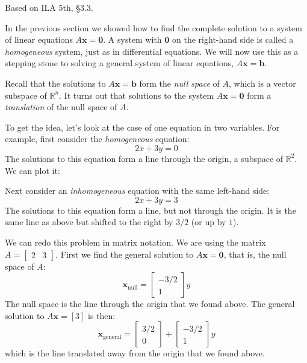 \documentclass[11pt,oneside]{amsbook}
\newcommand{\R}{\mathbb R}
\theoremstyle{definition}
\theoremstyle{plain}
\theoremstyle{definition}
\theoremstyle{remark}
\numberwithin{equation}{section}
\numberwithin{figure}{section}
\begin{document}
Based on ILA 5th, \S 3.3.

In the previous section we showed how to find the complete solution to a system of linear equations $A\bm{x}=\bm{0}$. A system with $\bm{0}$ on the right-hand side is called a \emph{homogeneous} system, just as in differential equations. We will now use this as a stepping stone to solving a general system of linear equations, $A\bm{x}=\bm{b}$.

Recall that the solutions to $A\bm{x}=\bm{b}$ form the \emph{null space} of $A$, which is a vector subspace of $\R^n$. It turns out that solutions to the system $A\bm{x}=\bm{0}$ form a \emph{translation} of the null space of $A$.

To get the idea, let's look at the case of one equation in two variables. For example, first consider the \emph{homogeneous} equation:
\[2x+3y=0
\]
The solutions to this equation form a line through the origin, a subspace of $\R^2$. We can plot it:

\begin{center}
\end{center}

Next consider an \emph{inhomogeneous} equation with the same left-hand side:
\[2x+3y=3
\]
The solutions to this equation form a line, but not through the origin. It is the same line as above but shifted to the right by $3/2$ (or up by $1$).

\begin{center}
\end{center}

We can redo this problem in matrix notation. We are using the matrix $A=\begin{bmatrix}2&3\end{bmatrix}$. First we find the general solution to $A\bm{x}=\bm{0}$, that is, the null space of $A$:
\[\bm{x}_{\mathrm{null}}
  =\begin{bmatrix}-3/2\\1\end{bmatrix}y
\]
The null space is the line through the origin that we found above. The general solution to $A\bm{x}=[3]$ is then:
\[\bm{x}_{\mathrm{general}}
  =\begin{bmatrix}3/2\\0\end{bmatrix}
  +\begin{bmatrix}-3/2\\1\end{bmatrix}y
\]
which is the line translated away from the origin that we found above.
\end{document}
